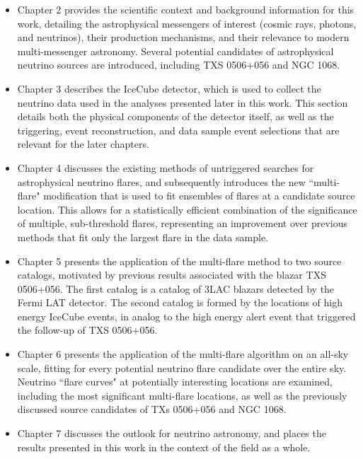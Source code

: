 \begin{itemize}
    \item Chapter 2 provides the scientific context and background information for this work, detailing the astrophysical messengers of interest (cosmic rays, photons, and neutrinos), their production mechanisms, and their relevance to modern multi-messenger astronomy. Several potential candidates of astrophysical neutrino sources are introduced, including TXS 0506+056 and NGC 1068.
    \item Chapter 3 describes the IceCube detector, which is used to collect the neutrino data used in the analyses presented later in this work. This section details both the physical components of the detector itself, as well as the triggering, event reconstruction, and data sample event selections that are relevant for the later chapters.
    \item Chapter 4 discusses the existing methods of untriggered searches for astrophysical neutrino flares, and subsequently introduces the new ``multi-flare" modification that is used to fit ensembles of flares at a candidate source location. This allows for a statistically efficient combination of the significance of multiple, sub-threshold flares, representing an improvement over previous methods that fit only the largest flare in the data sample.
    \item Chapter 5 presents the application of the multi-flare method to two source catalogs, motivated by previous results associated with the blazar TXS 0506+056. The first catalog is a catalog of 3LAC blazars detected by the Fermi LAT detector. The second catalog is formed by the locations of high energy IceCube events, in analog to the high energy alert event that triggered the follow-up of TXS 0506+056.
    \item Chapter 6 presents the application of the multi-flare algorithm on an all-sky scale, fitting for every potential neutrino flare candidate over the entire sky. Neutrino ``flare curves" at potentially interesting locations are examined, including the most significant multi-flare locations, as well as the previously discussed source candidates of TXs 0506+056 and NGC 1068.
    \item Chapter 7 discusses the outlook for neutrino astronomy, and places the results presented in this work in the context of the field as a whole. 
\end{itemize}

